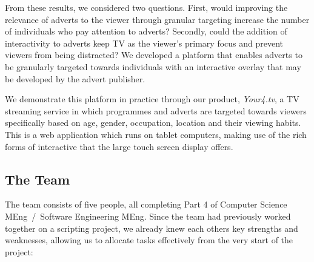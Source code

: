 From these results, we considered two questions. First, would improving the relevance of adverts to the viewer through granular targeting increase the number of individuals who pay attention to adverts? Secondly, could the addition of interactivity to adverts keep TV as the viewer's primary focus and prevent viewers from being distracted? We developed a platform that enables adverts to be granularly targeted towards individuals with an interactive overlay that may be developed by the advert publisher. 

We demonstrate this platform in practice through our product, \textit{Your4.tv}, a TV streaming service in which programmes and adverts are targeted towards viewers specifically based on age, gender, occupation, location and their viewing habits. This is a web application which runs on tablet computers, making use of the rich forms of interactive that the large touch screen display offers.




\subsection{The Team}

The team consists of five people, all completing Part 4 of Computer Science MEng~/~Software Engineering MEng. Since the team had previously worked together on a scripting project, we already knew each others key strengths and weaknesses, allowing us to allocate tasks effectively from the very start of the project:

